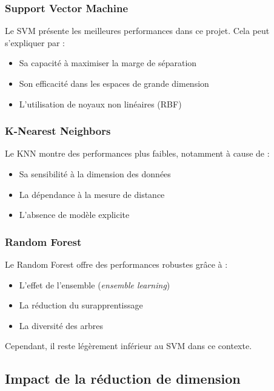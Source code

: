 \documentclass[12pt,a4paper]{article}
\begin{document}
    \subsubsection{Support Vector Machine}

    Le SVM présente les meilleures performances dans ce projet. Cela peut s’expliquer par :
    \begin{itemize}
        \item Sa capacité à maximiser la marge de séparation
        \item Son efficacité dans les espaces de grande dimension
        \item L’utilisation de noyaux non linéaires (RBF)
    \end{itemize}

    \subsubsection{K-Nearest Neighbors}

    Le KNN montre des performances plus faibles, notamment à cause de :
    \begin{itemize}
        \item Sa sensibilité à la dimension des données
        \item La dépendance à la mesure de distance
        \item L’absence de modèle explicite
    \end{itemize}

    \subsubsection{Random Forest}

    Le Random Forest offre des performances robustes grâce à :
    \begin{itemize}
        \item L’effet de l’ensemble (\textit{ensemble learning})
        \item La réduction du surapprentissage
        \item La diversité des arbres
    \end{itemize}

    Cependant, il reste légèrement inférieur au SVM dans ce contexte.

    \subsection{Impact de la réduction de dimension}
\end{document}
